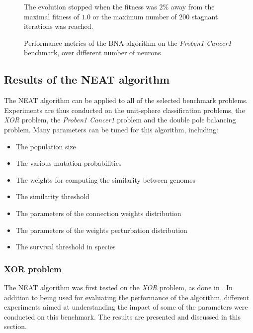 \begin{figure}
\begin{center}
    \end{center}
    \caption{Performance metrics of the BNA algorithm on the \textit{Proben1 Cancer1} benchmark, over different number of neurons}
    {The evolution stopped when the fitness was $2\%$ away from the maximal fitness of $1.0$ or the maximum number of $200$ stagnant iterations was reached.}
    \label{fig:bna_proben1}
\end{figure}

\subsection{Results of the NEAT algorithm}

The NEAT algorithm can be applied to all of the selected benchmark problems. Experiments are thus conducted on the unit-sphere classification problems, the \textit{XOR}
problem, the \textit{Proben1 Cancer1} problem and the double pole balancing problem. Many parameters can be tuned for this algorithm, including:

\begin{itemize}
    \item The population size
    \item The various mutation probabilities
    \item The weights for computing the similarity between genomes
    \item The similarity threshold
    \item The parameters of the connection weights distribution
    \item The parameters of the weights perturbation distribution
    \item{The survival threshold in species}
\end{itemize}

\subsubsection{XOR problem}

The NEAT algorithm was first tested on the \textit{XOR} problem, as done in \cite{neat}. In addition to being used for evaluating the performance of the algorithm, different experiments aimed
at understanding the impact of some of the parameters were conducted on this benchmark. The results are presented and discussed in this section.

